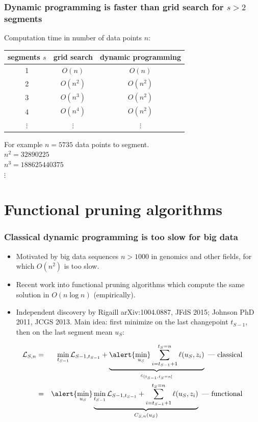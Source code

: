 \documentclass{beamer}
\begin{document}
\begin{frame}
  \frametitle{Dynamic programming is faster than grid search for $s>
    2$ segments}

  Computation time in number of data points $n$:

  \vskip 1cm

  \begin{tabular}{ccc}
    segments $s$ & grid search & dynamic programming \\
    \hline
    1 & $O(n)$ & $O(n)$ \\
    2 & $O(n^2)$ & $O(n^2)$ \\
    3 & $O(n^3)$ & $O(n^2)$ \\
    4 & $O(n^4)$ & $O(n^2)$ \\
    $\vdots$ &     $\vdots$ &     $\vdots$ 
  \end{tabular}

  \vskip 1cm

  For example $n = 5735$ data points to segment.\\
  $n^2 = 32890225$\\
  $n^3 = 188625440375$\\
  $\vdots$
\end{frame}



\section{Functional pruning algorithms}

\begin{frame}
  \frametitle{Classical dynamic programming is too slow for big data}
  \begin{itemize}
  \item Motivated by big data sequences $n>1000$ in genomics and other
    fields, for which $O(n^2)$ is too slow.
  \item Recent work into functional pruning algorithms which compute
    the same solution in $O(n\log n)$ (empirically).
  \item Independent discovery by Rigaill arXiv:1004.0887, JFdS 2015;
    Johnson PhD 2011, JCGS 2013. Main idea: first minimize on the last
    changepoint $t_{S-1}$, then on the last segment mean $u_S$:
  \end{itemize}
\begin{eqnarray*}
  \mathcal L_{S,n} &=& \min_{t_{S-1}}
\mathcal L_{S-1, t_{S-1}}
 +
\underbrace{\alert{\min_{u_S}} \sum_{i=t_{S-1}+1}^{t_S=n} \ell( u_S,  z_i)}_{
c_{(t_{S-1}, t_S=n]}
}\text{ --- classical}\\
&=& \alert{\min_{u_S} }
\underbrace{
\min_{t_{S-1}}
\mathcal L_{S-1, t_{S-1}}
 +
\sum_{i=t_{S-1}+1}^{t_S=n} \ell( u_S,  z_i)
}_{
C_{S,n}(u_S)
}\text{ --- functional}
\end{eqnarray*}
\end{frame}
\end{document}
